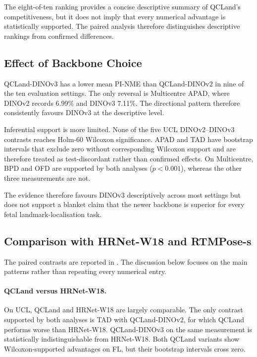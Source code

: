 The eight-of-ten ranking provides a concise descriptive summary of
QCLand's competitiveness, but it does not imply that every numerical
advantage is statistically supported. The paired analysis therefore
distinguishes descriptive rankings from confirmed differences.


\subsection{Effect of Backbone Choice}
\label{sec:results-backbone}

QCLand-DINOv3 has a lower mean PI-NME than QCLand-DINOv2 in nine of
the ten evaluation settings. The only reversal is Multicentre APAD,
where DINOv2 records 6.99\% and DINOv3 7.11\%. The directional
pattern therefore consistently favours DINOv3 at the descriptive
level.

Inferential support is more limited. None of the five UCL
DINOv2--DINOv3 contrasts reaches Holm-60 Wilcoxon significance.
APAD and TAD have bootstrap intervals that exclude zero without
corresponding Wilcoxon support and are therefore treated as
test-discordant rather than confirmed effects. On Multicentre, BPD
and OFD are supported by both analyses ($p<0.001$), whereas the other
three measurements are not.

The evidence therefore favours DINOv3 descriptively across most
settings but does not support a blanket claim that the newer backbone
is superior for every fetal landmark-localisation task.


\subsection{Comparison with HRNet-W18 and RTMPose-s}
\label{sec:results-baselines}

The paired contrasts are reported in
. The discussion below
focuses on the main patterns rather than repeating every numerical
entry.

\paragraph{QCLand versus HRNet-W18.}
On UCL, QCLand and HRNet-W18 are largely comparable. The only
contrast supported by both analyses is TAD with QCLand-DINOv2, for
which QCLand performs worse than HRNet-W18. QCLand-DINOv3 on the
same measurement is statistically indistinguishable from HRNet-W18.
Both QCLand variants show Wilcoxon-supported advantages on FL, but
their bootstrap intervals cross zero.

